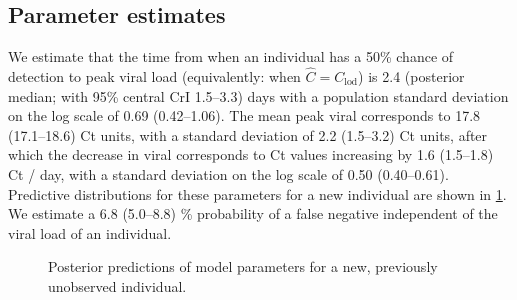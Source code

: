 \documentclass[thesis.tex]{subfiles}
\begin{document}
\subsection{Parameter estimates}

We estimate that the time from when an individual has a 50\% chance of detection to peak viral load (equivalently: when $\hat{C} = C_\text{lod}$) is 2.4 (posterior median; with 95\% central CrI 1.5--3.3) days with a population standard deviation on the log scale of 0.69 (0.42--1.06).
The mean peak viral corresponds to 17.8 (17.1--18.6) Ct units, with a standard deviation of 2.2 (1.5--3.2) Ct units, after which the decrease in viral corresponds to Ct values increasing by 1.6 (1.5--1.8) Ct / day, with a standard deviation on the log scale of 0.50 (0.40--0.61).
Predictive distributions for these parameters for a new individual are shown in \cref{fig:paper:indiv_predict}.
We estimate a 6.8 (5.0--8.8) \% probability of a false negative independent of the viral load of an individual.

\begin{figure}
    \centering
    \caption{Posterior predictions of model parameters for a new, previously unobserved individual.}
    \label{fig:paper:indiv_predict}
\end{figure}
\end{document}
